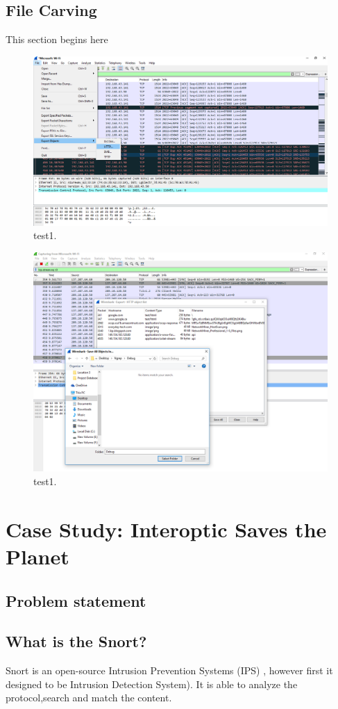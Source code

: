 \documentclass{article}
\begin{document}
\subsection{File Carving}
This section begins here
\begin{figure}[H]
	\begin{center}
		\includegraphics[width=0.6
\textwidth]{FILECARVING1.png}
	\end{center}
	\caption{test1.}
	\label{fig:Prd}
\end{figure}

\begin{figure}[H]
	\begin{center}
		\includegraphics[width=0.6
\textwidth]{FILECARVING2.png}
	\end{center}
	\caption{test1.}
	\label{fig:Prd}
\end{figure}


\section{Case Study: Interoptic Saves the Planet}


\subsection{Problem statement}




\subsection{What is the Snort?}
Snort is an open-source Intrusion Prevention Systems (IPS) , however first it designed to be Intrusion Detection System). It is able to analyze the protocol,search and match the content\cite{carr_2007}. \\
\end{document}
